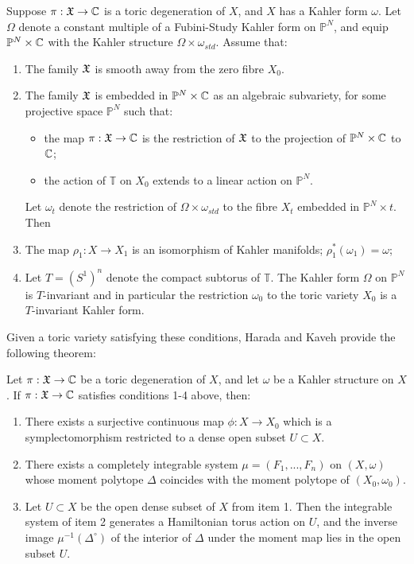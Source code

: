 	Suppose $\pi:\mathfrak{X}\to\mathbb{C}$ is a toric degeneration of $X$, and $X$ has a Kahler form $\omega$. Let $\Omega$ denote a constant multiple of a Fubini-Study Kahler form on $\mathbb{P}^N$, and equip $\mathbb{P}^N\times\mathbb{C}$ with the Kahler structure $\Omega \times \omega_{std}$. Assume that:
	\begin{enumerate}
		\item The family $\mathfrak{X}$ is smooth away from the zero fibre $X_0$.
		\item The family $\mathfrak{X}$ is embedded in $\mathbb{P}^N\times \mathbb{C}$ as an algebraic subvariety, for some projective space $\mathbb{P}^N$ such that:
		\begin{itemize}
			\item the map $\pi:\mathfrak{X}\to\mathbb{C}$ is the restriction of $\mathfrak{X}$ to the projection of $\mathbb{P}^N\times \mathbb{C}$ to $\mathbb{C}$;
			\item the action of $\mathbb{T}$ on $X_0$ extends to a linear action on $\mathbb{P}^N$.
		\end{itemize}
		Let $\omega_t$ denote the restriction of $\Omega\times \omega_{std}$ to the fibre $X_t$ embedded in $\mathbb{P}^N \times {t}$. Then
		\item The map $\rho_1 : X\to X_1$ is an isomorphism of Kahler manifolds; $\rho_1^\ast(\omega_1) = \omega$;
		\item Let $T = (S^1)^n$ denote the compact subtorus of $\mathbb{T}$. The Kahler form $\Omega$ on $\mathbb{P}^N$ is $T$-invariant and in particular the restriction $\omega_0$ to the toric variety $X_0$ is a $T$-invariant Kahler form.
	\end{enumerate}
	Given a toric variety satisfying these conditions, Harada and Kaveh provide the following theorem:
	\begin{theorem}
		\label{t:haradakaveh}
		Let $\pi:\mathfrak{X}\to \mathbb{C}$ be a toric degeneration of $X$, and let $\omega$ be a Kahler structure on $X$. If $\pi:\mathfrak{X}\to\mathbb{C}$ satisfies conditions 1-4 above, then:
		\begin{enumerate}
			\item There exists a surjective continuous map $\phi:X\to X_0$ which is a symplectomorphism restricted to a dense open subset $U\subset X$.
			\item There exists a completely integrable system $\mu = (F_1,...,F_n)$ on $(X,\omega)$ whose moment polytope $\Delta$ coincides with the moment polytope of $(X_0, \omega_0)$.
			\item Let $U\subset X$ be the open dense subset of $X$ from item 1. Then the integrable system of item 2 generates a Hamiltonian torus action on $U$, and the inverse image $\mu^{-1}(\Delta^\circ)$ of the interior of $\Delta$ under the moment map lies in the open subset $U$.
		\end{enumerate}
	\end{theorem}

